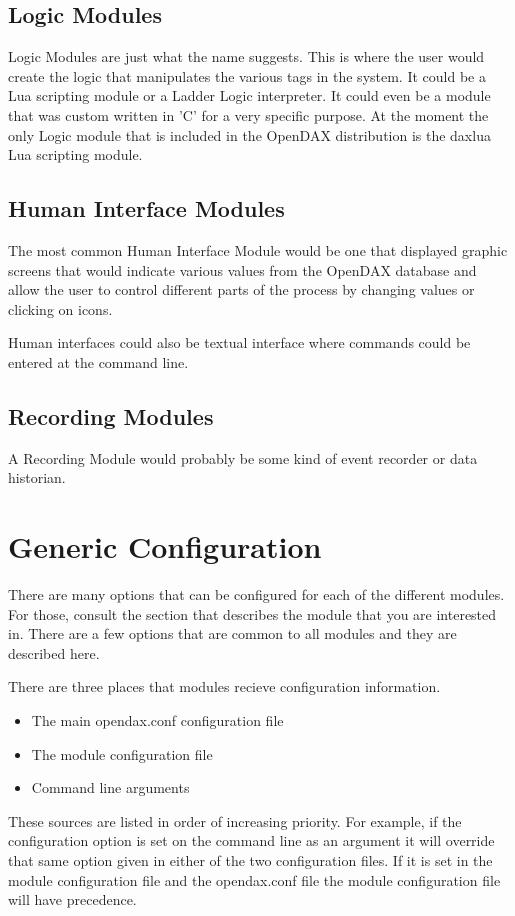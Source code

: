 \documentclass[letterpaper,10pt]{book}
\begin{document}
\subsection*{Logic Modules}
Logic Modules are just what the name suggests.  This is where the user would create the logic that manipulates the various tags in the system.  It could be a Lua scripting module or a Ladder Logic interpreter.  It could even be a module that was custom written in 'C' for a very specific purpose.  At the moment the only Logic module that is included in the OpenDAX distribution is the daxlua Lua scripting module.

\subsection*{Human Interface Modules}
The most common Human Interface Module would be one that displayed graphic screens that would indicate various values from the OpenDAX database and allow the user to control different parts of the process by changing values or clicking on icons.

Human interfaces could also be textual interface where commands could be entered at the command line.

\subsection*{Recording Modules}
A Recording Module would probably be some kind of event recorder or data historian.

\section*{Generic Configuration}
There are many options that can be configured for each of the different modules.  For those, consult the section that describes the module that you are interested in.  There are a few options that are common to all modules and they are described here.

There are three places that modules recieve configuration information.

\begin{itemize}
\item The main opendax.conf configuration file
\item The module configuration file
\item Command line arguments
\end{itemize}

These sources are listed in order of increasing priority.  For example, if the configuration option is set on the command line as an argument it will override that same option given in either of the two configuration files.  If it is set in the module configuration file and the opendax.conf file the module configuration file will have precedence.
\end{document}
